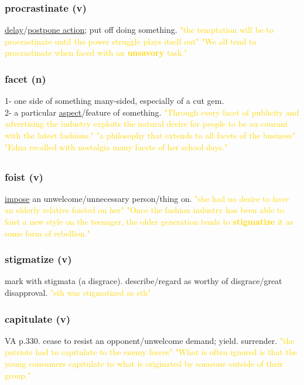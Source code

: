 \documentclass{proc}
\begin{document}
	\subsubsection{\textcolor{brickred}{procrastinate} (v)}
	\underline{delay}/\underline{postpone action}; put off doing something.
	\textcolor{gold}{"the temptation will be to procrastinate until the power struggle plays itself out" "We all tend to procrastinate when faced with an \textbf{unsavory} task."}
	
	\subsubsection{\textcolor{brickred}{facet} (n)}
	1- one side of something many-sided, especially of a cut gem.\\
	2- a particular \underline{aspect}/feature of something.
	\textcolor{gold}{"Through every facet of publicity and advertising the industry exploits the natural desire for people to be au courant with the latest fashions." "a philosophy that extends to all facets of the business" "Edna recalled with nostalgia many facets of her school days."}
	
	\newpage
	\subsection{}
	\subsubsection{\textcolor{brickred}{foist} (v)}
	\underline{impose} an unwelcome/unnecessary person/thing on.
	\textcolor{gold}{"she had no desire to have an elderly relative foisted on her" "Once the fashion industry has been able to foist a new style on the teenager, the older generation tends to \textbf{stigmatize} it as some form of rebellion."}
	
	\subsubsection{\textcolor{brickred}{stigmatize} (v)}
	mark with stigmata (a disgrace). describe/regard as worthy of disgrace/great disapproval.
	\textcolor{gold}{"sth was stigmatized as sth"}
	
	\subsubsection{\textcolor{brickred}{capitulate} (v)}
	VA p.330. cease to resist an opponent/unwelcome demand; yield. surrender.
	\textcolor{gold}{"the patriots had to capitulate to the enemy forces" "What is often ignored is that the young consumers capitulate to what is originated by someone outside of their group."}
	
\end{document}
